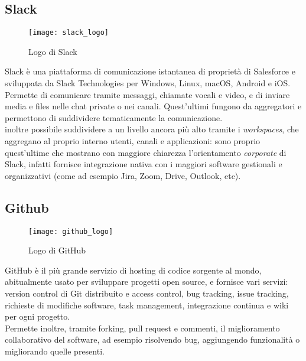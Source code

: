 \subsection{Slack}
\begin{figure}[ht]
    \centering
    \texttt{[image: slack\_logo]}
    \caption{Logo di Slack}
\end{figure}
Slack è una piattaforma di comunicazione istantanea di proprietà di Salesforce e sviluppata da Slack Technologies per Windows, Linux, macOS, Android e iOS.\\
Permette di comunicare tramite messaggi, chiamate vocali e video, e di inviare media e files nelle chat private o nei canali. Quest'ultimi fungono da aggregatori e permettono di suddividere tematicamente la comunicazione.\\
\E{} inoltre possibile suddividere a un livello ancora più alto tramite i \textit{workspaces}, che aggregano al proprio interno utenti, canali e applicazioni: sono proprio quest'ultime che mostrano con maggiore chiarezza l'orientamento \textit{corporate} di Slack, infatti fornisce integrazione nativa con i maggiori software gestionali e organizzativi (come ad esempio Jira, Zoom, Drive, Outlook, etc).

\subsection{Github}
\begin{figure}[ht]
    \centering
    \texttt{[image: github\_logo]}
    \caption{Logo di GitHub}
\end{figure}
GitHub è il più grande servizio di hosting di codice sorgente al mondo, abitualmente usato per sviluppare progetti open source, e fornisce vari servizi: version control di Git distribuito e access control, bug tracking, issue tracking, richieste di modifiche software, task management, integrazione continua e wiki per ogni progetto.\\ 
Permette inoltre, tramite forking, pull request e commenti, il miglioramento collaborativo del software, ad esempio risolvendo bug, aggiungendo funzionalità o migliorando quelle presenti.

